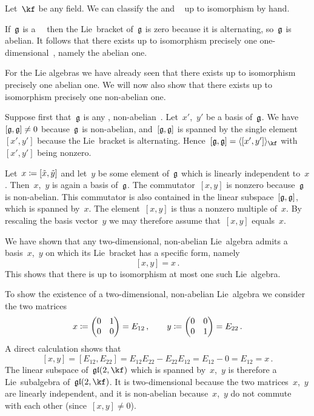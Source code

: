 \begin{example}
  Let~$\kf$ be any field.
  We can classify the {\onedimensional} and {\twodimensional}~\liealgebras{$\kf$} up to isomorphism by hand.
  
  If~$\mathfrak{g}$ is a~{\onedimensional}~\liealgebra{$\kf$} then the Lie~bracket of~$\mathfrak{g}$ is zero because it is alternating, so~$\mathfrak{g}$ is abelian.
  It follows that there exists up to isomorphism precisely one one-dimensional~\liealgebra{$\kf$}, namely the abelian one.
 
  For the {\twodimensional} Lie algebras we have already seen that there exists up to isomorphism precisely one abelian one.
  We will now also show that there exists up to isomorphism precisely one non-abelian one.
  
  Suppose first that~$\mathfrak{g}$ is any {\twodimensional}, non-abelian~\liealgebra{$\kf$}.
  Let~$x'$,~$y'$ be a basis of~$\mathfrak{g}$.
  We have~$[\mathfrak{g}, \mathfrak{g}] \neq 0$ because~$\mathfrak{g}$ is non-abelian, and~$[\mathfrak{g}, \mathfrak{g}]$ is spanned by the single element~$[x',y']$ because the Lie~bracket is alternating.
  Hence~$[\glie, \glie] = \gen{ [x', y'] }_{\kf}$ with~$[x', y']$ being nonzero.

  Let~$x \coloneqq [\tilde{x},\tilde{y}]$ and let~$y$ be some element of~$\mathfrak{g}$ which is linearly independent to~$x$.
  Then~$x$,~$y$ is again a basis of~$\mathfrak{g}$.
  The commutator~$[x,y]$ is nonzero because~$\mathfrak{g}$ is non-abelian.
  This commutator is also contained in the linear subspace~$[\mathfrak{g}, \mathfrak{g}]$, which is spanned by~$x$.
  The element~$[x,y]$ is thus a nonzero multiple of~$x$.
  By rescaling the basis vector~$y$ we may therefore assume that~$[x,y]$ equals~$x$.

  We have shown that any two-dimensional, non-abelian Lie~algebra admits a basis~$x$,~$y$ on which its Lie~bracket has a specific form, namely
  \[
    [x,y] = x \,.
  \]
  This shows that there is up to isomorphism at most one such Lie~algebra.
 
  To show the existence of a two-dimensional, non-abelian Lie~algebra we consider the two matrices
  \[
    x
    \coloneqq
    \begin{pmatrix}
      0 & 1 \\
      0 & 0
    \end{pmatrix}
    =
    E_{12}  \,,
    \qquad
    y
    \coloneqq
    \begin{pmatrix}
      0 & 0 \\
      0 & 1
    \end{pmatrix}
    =
    E_{22}  \,.
  \]
  A direct calculation shows that
  \[
    [x,y]
    =
    [E_{12}, E_{22}]
    =
    E_{12} E_{22} - E_{22} E_{12}
    =
    E_{12} - 0
    =
    E_{12}
    =
    x \,.
  \]
  The linear subspace of~$\gllie(2, \kf)$ which is spanned by~$x$,~$y$ is therefore a Lie~subalgebra of~$\gllie(2, \kf)$.
  It is two-dimensional because the two matrices~$x$,~$y$ are linearly independent, and it is non-abelian because~$x$,~$y$ do not commute with each other (since~$[x,y] \neq 0$).


\end{example}
